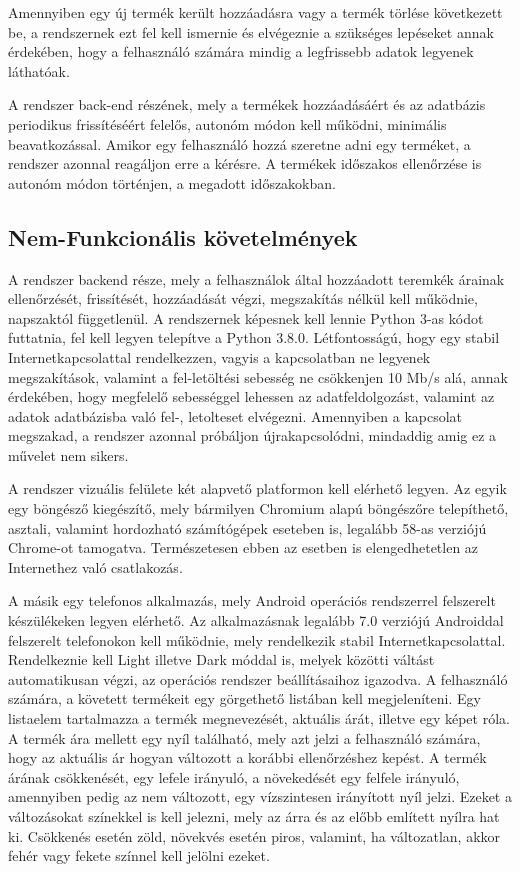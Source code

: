 Amennyiben egy új termék került hozzáadásra vagy a termék törlése következett be, a rendszernek ezt fel kell ismernie és elvégeznie a szükséges lepéseket annak érdekében, hogy a felhasználó számára mindig a legfrissebb adatok legyenek láthatóak.

A rendszer back-end részének, mely a termékek hozzáadásáért és az adatbázis periodikus frissítéséért felelős, autonóm módon kell működni, minimális beavatkozással. Amikor egy felhasználó hozzá szeretne adni egy terméket, a rendszer azonnal reagáljon erre a kérésre. A termékek időszakos ellenőrzése is autonóm módon történjen, a megadott időszakokban.

\subsection{Nem-Funkcionális követelmények}

A rendszer backend része, mely a felhasználok által hozzáadott teremkék árainak ellenőrzését, frissítését, hozzáadását végzi, megszakítás nélkül kell működnie, napszaktól függetlenül. A rendszernek képesnek kell lennie Python 3-as kódot futtatnia, fel kell legyen telepítve a Python 3.8.0. Létfontosságú, hogy egy stabil Internetkapcsolattal rendelkezzen, vagyis a kapcsolatban ne legyenek megszakítások, valamint a fel-letöltési sebesség ne csökkenjen 10 Mb/s alá, annak érdekében, hogy megfelelő sebességgel lehessen az adatfeldolgozást, valamint az adatok adatbázisba való fel-, letolteset elvégezni. Amennyiben a kapcsolat megszakad, a rendszer azonnal próbáljon újrakapcsolódni, mindaddig amig ez a művelet nem sikers.

A rendszer vizuális felülete két alapvető platformon kell elérhető legyen. Az egyik egy böngésző kiegészítő, mely bármilyen Chromium alapú böngészőre telepíthető, asztali, valamint hordozható számítógépek eseteben is, legalább 58-as verziójú Chrome-ot tamogatva. Természetesen ebben az esetben is elengedhetetlen az Internethez való csatlakozás.

A másik egy telefonos alkalmazás, mely Android operációs rendszerrel felszerelt készülékeken legyen elérhető. Az alkalmazásnak legalább 7.0 verziójú Androiddal felszerelt telefonokon kell működnie, mely rendelkezik stabil Internetkapcsolattal. Rendelkeznie kell Light illetve Dark móddal is, melyek közötti váltást automatikusan végzi, az operációs rendszer beállításaihoz igazodva. A felhasználó számára, a követett termékeit egy görgethető listában kell megjeleníteni. Egy listaelem tartalmazza a termék megnevezését, aktuális árát, illetve egy képet róla. A termék ára mellett egy nyíl található, mely azt jelzi a felhasználó számára, hogy az aktuális ár hogyan változott a korábbi ellenőrzéshez kepést. A termék árának csökkenését, egy lefele irányuló, a növekedését egy felfele irányuló, amennyiben pedig az nem változott, egy vízszintesen irányított nyíl jelzi. Ezeket a változásokat színekkel is kell jelezni, mely az árra és az előbb említett nyílra hat ki. Csökkenés esetén zöld, növekvés esetén piros, valamint, ha változatlan, akkor fehér vagy fekete színnel kell jelölni ezeket.

